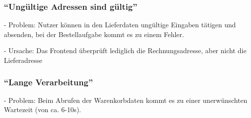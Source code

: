 %
%

\subsubsection{\enquote{Ungültige Adressen sind gültig}}
\label{subsec:ungueltige-adressen-sind-gueltig}

- Problem: Nutzer können in den Lieferdaten ungültige Eingaben tätigen und absenden, bei der Bestellaufgabe kommt es zu einem Fehler.

- Ursache: Das Frontend überprüft lediglich die Rechnungsadresse, aber nicht die Lieferadresse

%
%

%
%

\subsubsection{\enquote{Lange Verarbeitung}}
\label{subsec:lange-verarbeitung}

- Problem: Beim Abrufen der Warenkorbdaten kommt es zu einer unerwünschten Wartezeit (von ca. 6-10s).

